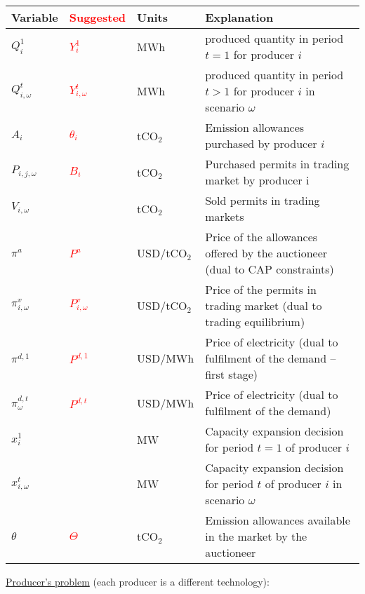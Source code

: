 \documentclass[11pt, letterpaper]{article}
\newcommand\boldred[1]{\textcolor{red}{\textbf{#1}}}
\begin{document}
\begin{center}
\begin{tabular}{  l l l l  } 
 \hline
 \textbf{Variable} & \boldred{Suggested} & \textbf{Units} & \textbf{Explanation} \\ 
 \hline
 \hline
 $Q^{1}_i$ & \boldred{$Y^{1}_{i}$} & MWh & produced quantity in period $t =1  $ for producer $i$\\
 $Q^{t}_{i,\omega}$ & \boldred{$Y^{t}_{i,\omega}$} & MWh & produced quantity in period $t > 1 $ for producer $i$ in scenario $\omega$ \\  
 $A_i$ & \boldred{$\theta_i$} & tCO$_2$ & Emission allowances purchased by producer $i$ \\ 
 $P_{i,j,\omega}$ & \boldred{$B_i$}& tCO$_2$ & Purchased permits in trading market by producer i  \\
 $V_{i,\omega}$ & & tCO$_2$ & Sold permits in trading markets \\
 $\pi^{a}$ & \boldred{$P^{a}$} & USD/tCO$_2$  & Price of the allowances offered by the auctioneer (dual to CAP constraints)\\
 $\pi^{v}_{i,\omega}$ & \boldred{$P^{v}_{i,\omega}$} & USD/tCO$_2$  & Price of the permits in trading market (dual to trading equilibrium)\\
  $\pi^{d,1}$ & \boldred{$P^{d,1}$} & USD/MWh  & Price of electricity (dual to fulfilment of the demand --first stage)\\
 $\pi^{d,t}_{\omega}$ & \boldred{$P^{d,t}$} & USD/MWh  & Price of electricity (dual to fulfilment of the demand)\\
 $x^{1}_i$ & & MW  & Capacity expansion decision for period $t=1$ of producer $i$\\
 $x^{t}_{i,\omega}$ & & MW  & Capacity expansion decision for period $t$ of producer $i$ in scenario $\omega$\\
  $\theta$ & \boldred{$\Theta$} & tCO$_2$ & Emission allowances available in the market by the auctioneer\\
\hline
\end{tabular}
\end{center}

\vspace{0.5cm}


\underline{Producer's problem} (each producer is a different technology):
\end{document}

